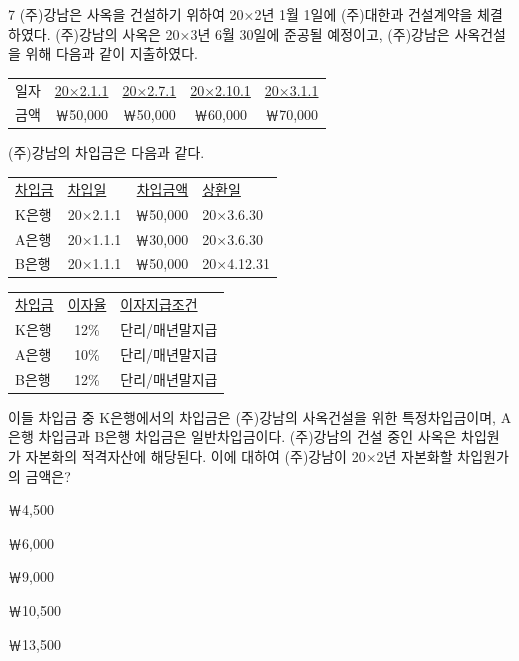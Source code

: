 \begin{question}{7}
(주)강남은 사옥을 건설하기 위하여 20×2년 1월 1일에 (주)대한과 건설계약을 체결하였다. (주)강남의 사옥은 20×3년 6월 30일에 준공될 예정이고,
(주)강남은 사옥건설을 위해 다음과 같이 지출하였다. \par
\begin{center}
\small
\begin{tabular}{l c c c c}
일자 & \uline{20×2.1.1} & \uline{20×2.7.1} & \uline{20×2.10.1} & \uline{20×3.1.1} \\
금액 & ￦50,000 & ￦50,000 & ￦60,000 & ￦70,000 \\
\end{tabular}
\end{center}
(주)강남의 차입금은 다음과 같다. \par
\begin{center}
\small
\begin{tabular}{l l r l}
\uline{차입금} & \uline{차입일} & \uline{차입금액} & \uline{상환일} \\
K은행 & 20×2.1.1 & ￦50,000 & 20×3.6.30 \\
A은행 & 20×1.1.1 & ￦30,000 & 20×3.6.30 \\
B은행 & 20×1.1.1 & ￦50,000 & 20×4.12.31 \\
\end{tabular}

\medskip
\begin{tabular}{l c l}
\uline{차입금} & \uline{이자율} & \uline{이자지급조건} \\
K은행 & 12\% & 단리/매년말지급 \\
A은행 & 10\% & 단리/매년말지급 \\
B은행 & 12\% & 단리/매년말지급 \\
\end{tabular}
\end{center}
이들 차입금 중 K은행에서의 차입금은 (주)강남의 사옥건설을 위한 특정차입금이며, A은행 차입금과 B은행 차입금은 일반차입금이다. (주)강남의 건설 중인 사옥은 차입원가 자본화의 적격자산에 해당된다. 이에 대하여 (주)강남이 20×2년 자본화할 차입원가의 금액은? \par
\begin{choices}
  \item ￦4,500
  \item ￦6,000
  \item ￦9,000
  \item ￦10,500
  \item ￦13,500
\end{choices}
\end{question}
